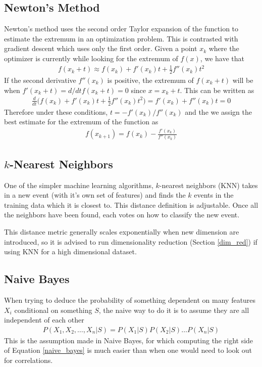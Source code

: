 \subsection{Newton's Method}
Newton's method uses the second order Taylor expansion of the function to estimate the extremum in an optimization problem. This is contrasted with gradient descent which uses only the first order. Given a point $x_k$ where the optimizer is currently while looking for the extremum of $f(x)$, we have that
\begin{align}
	f(x_k+t)\approx f(x_k) + f'(x_k)t + \frac{1}{2}f''(x_k)t^2
\end{align}
If the second derivative $f''(x_k)$ is positive, the extremum of $f(x_k+t)$ will be when $f'(x_k+t) = d/dt f(x_k+t) = 0$ since $x=x_k+t$. This can be written as 
\begin{align}
	\frac{d}{dt}\Big( f(x_k) + f'(x_k)t + \frac{1}{2}f''(x_k)t^2\Big) = f'(x_k)+f''(x_k)t = 0 
\end{align}
Therefore under these conditions, $t = -f'(x_k)/f''(x_k)$ and the we assign the best estimate for the extremum of the function as
\begin{align}
	f(x_{k+1}) = f(x_k)-\frac{f'(x_k)}{f''(x_k)}
\end{align} 


\subsection{$k$-Nearest Neighbors}
One of the simpler machine learning algorithms, $k$-nearest neighbors (KNN) takes in a new event (with it's own set of features) and finds the  $k$ events in the training data which it is closest to. This distance definition is adjustable. Once all the neighbors have been found, each votes on how to classify the new event.

This distance metric generally scales exponentially when new dimension are introduced, so it is advised to run dimensionality reduction (Section \ref{dim_red}) if using KNN for a high dimensional dataset.
\subsection{Naive Bayes}
When trying to deduce the probability of something dependent on many features $X_i$ conditional on something $S$, the naive way to do it is to assume they are all independent of each other
\begin{align}\label{naive_bayes}
	P(X_1,X_2,\dots,X_n|S) = P(X_1|S)P(X_2|S)\dots P(X_n|S)
\end{align}
This is the assumption made in Naive Bayes, for which computing the right side of Equation \ref{naive_bayes} is much easier than when one would need to look out for correlations.

